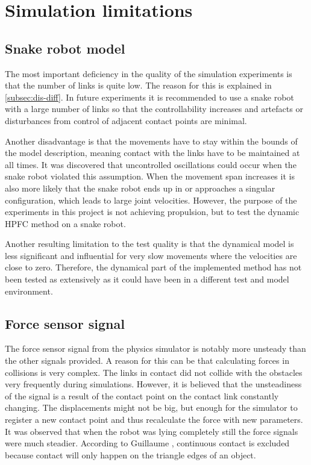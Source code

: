 

\section{Simulation limitations}

\subsection{Snake robot model}

The most important deficiency in the quality of the simulation experiments is that the number of links is quite low. The reason for this is explained in \ref{subsec:dis-diff}. In future experiments it is recommended to use a snake robot with a large number of links so that the controllability increases and artefacts or disturbances from control of adjacent contact points are minimal.

Another disadvantage is that the movements have to stay within the bounds of the model description, meaning contact with the links have to be maintained at all times. It was discovered that uncontrolled oscillations could occur when the snake robot violated this assumption. When the movement span increases it is also more likely that the snake robot ends up in or approaches a singular configuration, which leads to large joint velocities. However, the purpose of the experiments in this project is not achieving propulsion, but to test the dynamic HPFC method on a snake robot.

Another resulting limitation to the test quality is that the dynamical model is less significant and influential for very slow movements where the velocities are close to zero. Therefore, the dynamical part of the implemented method has not been tested as extensively as it could have been in a different test and model environment.

\subsection{Force sensor signal}

The force sensor signal from the physics simulator is notably more unsteady than the other signals provided. A reason for this can be that calculating forces in collisions is very complex. The links in contact did not collide with the obstacles very frequently during simulations. However, it is believed that the unsteadiness of the signal is a result of the contact point on the contact link constantly changing. The displacements might not be big, but enough for the simulator to register a new contact point and thus recalculate the force with new parameters. It was observed that when the robot was lying completely still the force signals were much steadier. According to Guillaume \cite{GuillaumeSnakeSIM}, continuous contact is excluded because contact will only happen on the triangle edges of an object.

